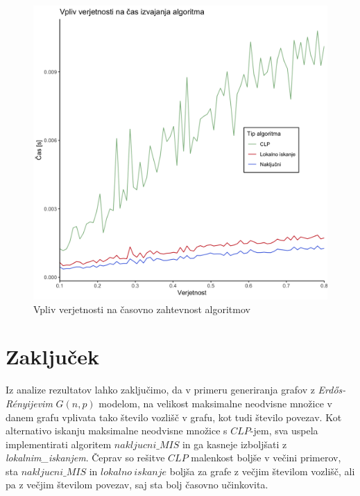\documentclass[a4paper, 12pt]{article}
\begin{document}
\begin{figure}[h!]
	\begin{center}
		\includegraphics[scale=0.12]{R_koda/ver-cas.png}
		\caption{Vpliv verjetnosti na časovno zahtevnost algoritmov}
	\end{center}
\end{figure}


\newpage
\section{Zaključek}

Iz analize rezultatov lahko zaključimo, da v primeru generiranja grafov z \textit{Erdős-Rényijevim} $G(n, p)$ modelom, na velikost maksimalne neodvisne množice v danem grafu
vplivata tako število vozlišč v grafu, kot tudi število povezav. Kot alternativo iskanju maksimalne neodvisne množice s $CLP$-jem, sva uspela implementirati algoritem $nakljucni\_MIS$
in ga kasneje izboljšati z \textit{lokalnim\_iskanjem}. Čeprav so rešitve $CLP$ malenkost boljše v večini primerov, sta $nakljucni\_MIS$ in $lokalno\ iskanje$ boljša za grafe z večjim številom vozlišč,
ali pa z večjim številom povezav, saj sta bolj časovno učinkovita.

\newpage
\end{document}
